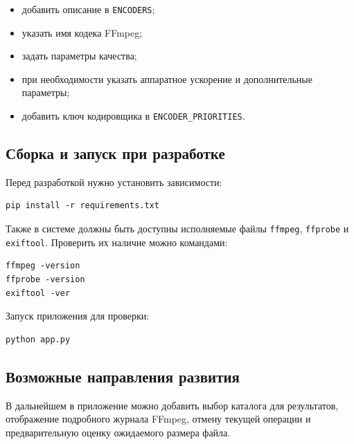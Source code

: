 \documentclass[14pt,a4paper]{extarticle}
\begin{document}
\begin{itemize}
	\item добавить описание в \texttt{ENCODERS};
	\item указать имя кодека FFmpeg;
	\item задать параметры качества;
	\item при необходимости указать аппаратное ускорение и дополнительные параметры;
	\item добавить ключ кодировщика в \texttt{ENCODER\_PRIORITIES}.
\end{itemize}

\subsection{Сборка и запуск при разработке}

Перед разработкой нужно установить зависимости:

\begin{verbatim}
pip install -r requirements.txt
\end{verbatim}

Также в системе должны быть доступны исполняемые файлы \texttt{ffmpeg}, \texttt{ffprobe} и \texttt{exiftool}. Проверить их наличие можно командами:

\begin{verbatim}
ffmpeg -version
ffprobe -version
exiftool -ver
\end{verbatim}

Запуск приложения для проверки:

\begin{verbatim}
python app.py
\end{verbatim}

\subsection{Возможные направления развития}

В дальнейшем в приложение можно добавить выбор каталога для результатов, отображение подробного журнала FFmpeg, отмену текущей операции и предварительную оценку ожидаемого размера файла.
\end{document}
